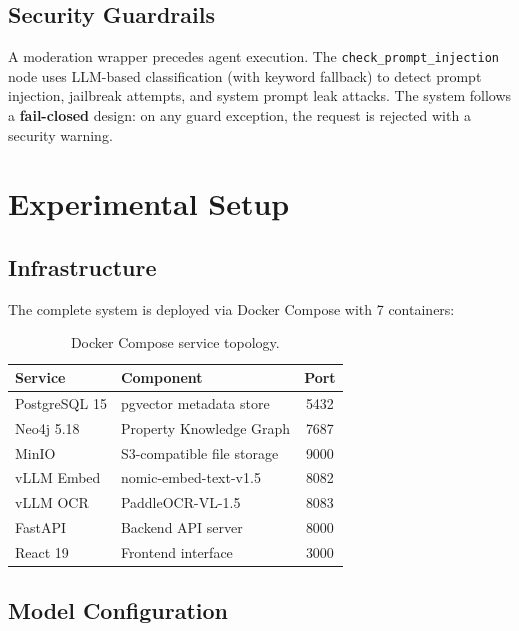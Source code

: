 \documentclass[11pt]{article}
\begin{document}
\subsection{Security Guardrails}

A moderation wrapper precedes agent execution. The \texttt{check\_prompt\_injection} node uses LLM-based classification (with keyword fallback) to detect prompt injection, jailbreak attempts, and system prompt leak attacks. The system follows a \textbf{fail-closed} design: on any guard exception, the request is rejected with a security warning.

\section{Experimental Setup}

\subsection{Infrastructure}

The complete system is deployed via Docker Compose with 7 containers:

\begin{table}[t]
\centering
\small
\begin{tabularx}{\columnwidth}{l X c}
\toprule
\textbf{Service} & \textbf{Component} & \textbf{Port} \\
\midrule
PostgreSQL 15 & pgvector metadata store & 5432 \\
Neo4j 5.18 & Property Knowledge Graph & 7687 \\
MinIO & S3-compatible file storage & 9000 \\
vLLM Embed & nomic-embed-text-v1.5 & 8082 \\
vLLM OCR & PaddleOCR-VL-1.5 & 8083 \\
FastAPI & Backend API server & 8000 \\
React 19 & Frontend interface & 3000 \\
\bottomrule
\end{tabularx}
\caption{Docker Compose service topology.}
\label{tab:services}
\end{table}

\subsection{Model Configuration}
\end{document}
